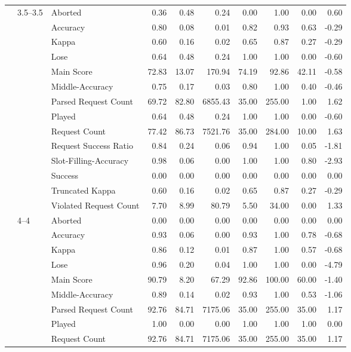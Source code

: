 \begin{tabular}{lllrrrrrrr}
\cline{2-10}
 & \multirow[t]{14}{*}{3.5--3.5} & Aborted & 0.36 & 0.48 & 0.24 & 0.00 & 1.00 & 0.00 & 0.60 \\
 &  & Accuracy & 0.80 & 0.08 & 0.01 & 0.82 & 0.93 & 0.63 & -0.29 \\
 &  & Kappa & 0.60 & 0.16 & 0.02 & 0.65 & 0.87 & 0.27 & -0.29 \\
 &  & Lose & 0.64 & 0.48 & 0.24 & 1.00 & 1.00 & 0.00 & -0.60 \\
 &  & Main Score & 72.83 & 13.07 & 170.94 & 74.19 & 92.86 & 42.11 & -0.58 \\
 &  & Middle-Accuracy & 0.75 & 0.17 & 0.03 & 0.80 & 1.00 & 0.40 & -0.46 \\
 &  & Parsed Request Count & 69.72 & 82.80 & 6855.43 & 35.00 & 255.00 & 1.00 & 1.62 \\
 &  & Played & 0.64 & 0.48 & 0.24 & 1.00 & 1.00 & 0.00 & -0.60 \\
 &  & Request Count & 77.42 & 86.73 & 7521.76 & 35.00 & 284.00 & 10.00 & 1.63 \\
 &  & Request Success Ratio & 0.84 & 0.24 & 0.06 & 0.94 & 1.00 & 0.05 & -1.81 \\
 &  & Slot-Filling-Accuracy & 0.98 & 0.06 & 0.00 & 1.00 & 1.00 & 0.80 & -2.93 \\
 &  & Success & 0.00 & 0.00 & 0.00 & 0.00 & 0.00 & 0.00 & 0.00 \\
 &  & Truncated Kappa & 0.60 & 0.16 & 0.02 & 0.65 & 0.87 & 0.27 & -0.29 \\
 &  & Violated Request Count & 7.70 & 8.99 & 80.79 & 5.50 & 34.00 & 0.00 & 1.33 \\
\cline{2-10}
 & \multirow[t]{14}{*}{4--4} & Aborted & 0.00 & 0.00 & 0.00 & 0.00 & 0.00 & 0.00 & 0.00 \\
 &  & Accuracy & 0.93 & 0.06 & 0.00 & 0.93 & 1.00 & 0.78 & -0.68 \\
 &  & Kappa & 0.86 & 0.12 & 0.01 & 0.87 & 1.00 & 0.57 & -0.68 \\
 &  & Lose & 0.96 & 0.20 & 0.04 & 1.00 & 1.00 & 0.00 & -4.79 \\
 &  & Main Score & 90.79 & 8.20 & 67.29 & 92.86 & 100.00 & 60.00 & -1.40 \\
 &  & Middle-Accuracy & 0.89 & 0.14 & 0.02 & 0.93 & 1.00 & 0.53 & -1.06 \\
 &  & Parsed Request Count & 92.76 & 84.71 & 7175.06 & 35.00 & 255.00 & 35.00 & 1.17 \\
 &  & Played & 1.00 & 0.00 & 0.00 & 1.00 & 1.00 & 1.00 & 0.00 \\
 &  & Request Count & 92.76 & 84.71 & 7175.06 & 35.00 & 255.00 & 35.00 & 1.17 \\

\end{tabular}
